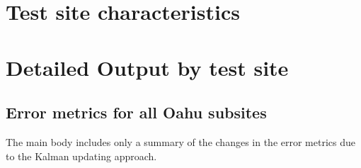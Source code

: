 \chapter{Test site characteristics}


\chapter{Detailed Output by test site}\label{ch:subsite-appendix}
\section{Error metrics for all Oahu subsites}

The main body includes only a summary of the changes in the error metrics due to the Kalman updating approach.


